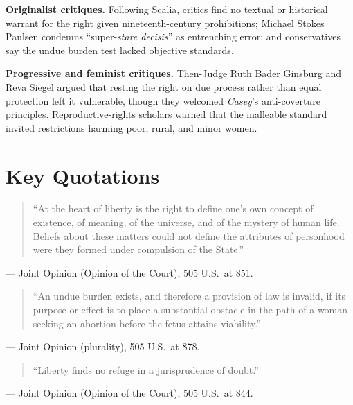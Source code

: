 \documentclass[12pt]{article}
\begin{document}
\textbf{Originalist critiques.} Following Scalia, critics find no textual or historical warrant for the right given nineteenth-century prohibitions; Michael Stokes Paulsen condemns ``super-\textit{stare decisis}'' as entrenching error; and conservatives say the undue burden test lacked objective standards.

\textbf{Progressive and feminist critiques.} Then-Judge Ruth Bader Ginsburg and Reva Siegel argued that resting the right on due process rather than equal protection left it vulnerable, though they welcomed \textit{Casey}'s anti-coverture principles. Reproductive-rights scholars warned that the malleable standard invited restrictions harming poor, rural, and minor women.

\section{Key Quotations}

\begin{quote}
``At the heart of liberty is the right to define one's own concept of existence, of meaning, of the universe, and of the mystery of human life. Beliefs about these matters could not define the attributes of personhood were they formed under compulsion of the State.''
\end{quote}
\noindent --- Joint Opinion (Opinion of the Court), 505 U.S.\ at 851.

\begin{quote}
``An undue burden exists, and therefore a provision of law is invalid, if its purpose or effect is to place a substantial obstacle in the path of a woman seeking an abortion before the fetus attains viability.''
\end{quote}
\noindent --- Joint Opinion (plurality), 505 U.S.\ at 878.

\begin{quote}
``Liberty finds no refuge in a jurisprudence of doubt.''
\end{quote}
\noindent --- Joint Opinion (Opinion of the Court), 505 U.S.\ at 844.
\end{document}
